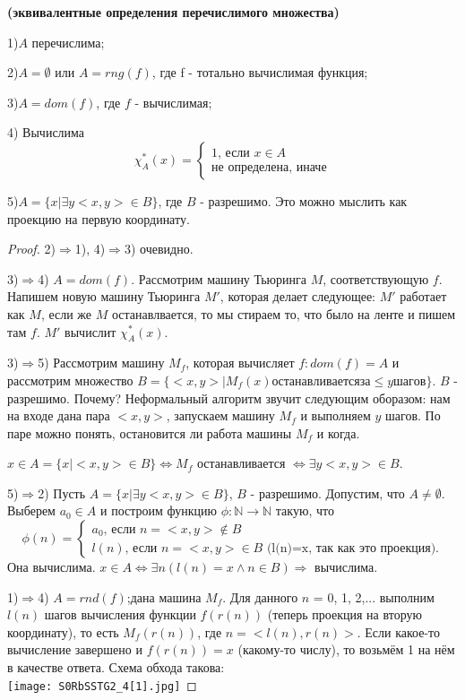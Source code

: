 \begin{theorem}{\textbf{(эквивалентные определения перечислимого множества)}}
\par 1)$A$ перечислима;
\par 2)$A = \emptyset $ или $A = rng(f)$, где f - тотально вычислимая функция;
\par 3)$A = dom(f)$, где $f$ - вычислимая;
\par 4) Вычислима \begin{equation*}
    \chi^*_{A}(x) = 
    \begin{cases}
    \text{1, если $x \in A$}\\
    \text{не определена, иначе}
    \end{cases}
\end{equation*}
\par 5)$A = \{ x| \exists y <x,y> \in B \}$, где $B$ - разрешимо. Это можно мыслить как проекцию на первую координату.
\begin{proof}

\par2)$\Rightarrow$1), 4)$\Rightarrow$3) очевидно.
\par3)$\Rightarrow$4) $A=dom(f)$. Рассмотрим машину Тьюринга $M$, соответствующую $f$. Напишем новую машину Тьюринга $M'$, которая делает следующее: $M'$ работает как $M$, если же $M$ останавлвается, то мы стираем то, что было на ленте и пишем там $f$. $M'$ вычислит $\chi^*_{A}(x)$.  
\par3)$\Rightarrow$5) Рассмотрим машину $M_{f}$, которая вычисляет $f: dom(f)=A$ и рассмотрим множество $B = \{<x,y>| M_{f}(x) останавливается за \leq y шагов \}$. $B$ - разрешимо. Почему? Неформальный алгоритм звучит следующим оборазом: нам на входе дана пара $<x,y>$, запускаем машину $M_{f}$ и выполняем $y$ шагов. По паре можно понять, остановится ли работа машины $M_{f}$ и когда.
\par $x \in A = \{ x| <x,y> \in B \} \iff M_{f}$ останавливается $\iff \exists y <x,y> \in B $.
\par5)$\Rightarrow$2) Пусть $A = \{ x| \exists y <x,y> \in B \}$, $B$ - разрешимо. Допустим, что $A \neq \emptyset$. Выберем $a_{0} \in A$ и построим функцию $\phi: \mathbb{N} \to \mathbb{N}$ такую, что 
\begin{equation*}
    \phi(n) = 
    \begin{cases}
    a_{0}\text{, если $n=<x,y> \notin B$}\\
    l(n)\text{, если $n=<x,y> \in B$ (l(n)=x, так как это проекция)}.
    \end{cases}
\end{equation*}
Она вычислима. $x \in A \iff \exists n (l(n)=x \land n \in B) \Rightarrow$ вычислима.
\par1)$\Rightarrow$4) $A = rnd(f)$;дана машина $M_{f}$. Для данного $n$ = 0, 1, 2,... выполним $l(n)$ шагов вычисления функции $f(r(n))$ (теперь проекция на вторую координату), то есть $M_{f}(r(n))$, где $n = <l(n), r(n)>$. Если какое-то вычисление завершено и $f(r(n))=x$ (какому-то числу), то возьмём 1 на нём в качестве ответа. Схема обхода такова: \\ 
\texttt{[image: S0RbSSTG2\_4[1].jpg]}
\end{proof}
\end{theorem}